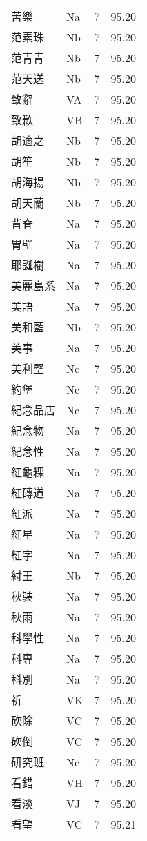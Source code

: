 \documentclass[twocolumn]{book}
\begin{document}
\begin{supertabular}{llrr}
苦樂 & Na & 7 &  95.20\\
范素珠 & Nb & 7 &  95.20\\
范青青 & Nb & 7 &  95.20\\
范天送 & Nb & 7 &  95.20\\
致辭 & VA & 7 &  95.20\\
致歉 & VB & 7 &  95.20\\
胡適之 & Nb & 7 &  95.20\\
胡笙 & Nb & 7 &  95.20\\
胡海揚 & Nb & 7 &  95.20\\
胡天蘭 & Nb & 7 &  95.20\\
背脊 & Na & 7 &  95.20\\
胃壁 & Na & 7 &  95.20\\
耶誕樹 & Na & 7 &  95.20\\
美麗島系 & Na & 7 &  95.20\\
美語 & Na & 7 &  95.20\\
美和藍 & Nb & 7 &  95.20\\
美事 & Na & 7 &  95.20\\
美利堅 & Nc & 7 &  95.20\\
約堡 & Nc & 7 &  95.20\\
紀念品店 & Nc & 7 &  95.20\\
紀念物 & Na & 7 &  95.20\\
紀念性 & Na & 7 &  95.20\\
紅龜粿 & Na & 7 &  95.20\\
紅磚道 & Na & 7 &  95.20\\
紅派 & Na & 7 &  95.20\\
紅星 & Na & 7 &  95.20\\
紅字 & Na & 7 &  95.20\\
紂王 & Nb & 7 &  95.20\\
秋裝 & Na & 7 &  95.20\\
秋雨 & Na & 7 &  95.20\\
科學性 & Na & 7 &  95.20\\
科專 & Na & 7 &  95.20\\
科別 & Na & 7 &  95.20\\
祈 & VK & 7 &  95.20\\
砍除 & VC & 7 &  95.20\\
砍倒 & VC & 7 &  95.20\\
研究班 & Nc & 7 &  95.20\\
看錯 & VH & 7 &  95.20\\
看淡 & VJ & 7 &  95.20\\
看望 & VC & 7 &  95.21\\

\end{supertabular}
\end{document}
